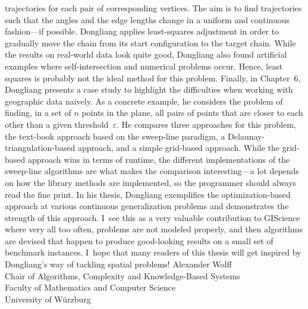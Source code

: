{trajectories for each pair of corresponding vertices.  
The aim is to find trajectories such that 
the angles and the edge lengths change 
in a uniform and continuous fashion---if possible.  
Dongliang applies least-squares adjustment in order to
gradually move the chain from its start configuration to the target
chain.  While the results on real-world data look quite good,
Dongliang also found artificial examples where self-intersection and
numerical problems occur.  Hence, least squares is probably not the
ideal method for this problem.
%
\newline\indent
%
Finally, in Chapter~6, Dongliang presents a case study to highlight
the difficulties when working with geographic data naively.  As a
concrete example, he considers the problem of finding, in a set of
$n$ points in the plane, all pairs of points that are closer to each
other than a given threshold~$\varepsilon$.  He compares three
approaches for this problem, the text-book approach based on the
sweep-line paradigm, a Delaunay-triangulation-based approach, and a
simple grid-based approach.  While the grid-based approach wins in
terms of runtime, the different implementations of the sweep-line
algorithms are what makes the comparison interesting---a lot
depends on how the library methods are implemented, 
so the programmer should always read the fine print.
%
\newline\indent
%
In his thesis, Dongliang exemplifies the optimization-based approach
at various continuous generalization problems and demonstrates the
strength of this approach.  I~see this as a very valuable
contribution to GIScience where very all too often, problems are not
modeled properly, and then algorithms are devised that happen to
produce good-looking results on a small set of benchmark instances.
I~hope that many readers of this thesis will get inspired by
Dongliang's way of tackling spatial problems!
%
\newline
\newline
\newline
%
Alexander Wolff\\
Chair of Algorithms, 
Complexity and Knowledge-Based Systems\\
Faculty of Mathematics and Computer Science\\
University of W\"urzburg
}



